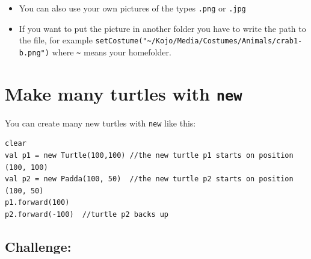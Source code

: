 \begin{itemize}

\item {You can also use your own pictures of the types \lstinline{.png} or \lstinline{.jpg}}
\item {If you want to put the picture in another folder you have to write the path to the file, for example \lstinline{setCostume("~/Kojo/Media/Costumes/Animals/crab1-b.png")} where \lstinline{~} means your homefolder.}

\end{itemize}


\chapter{Make many turtles with \lstinline{new}}You can create many new turtles with \lstinline{new} like this:

\begin{lstlisting}[basicstyle={\ttfamily\fontsize{18}{22}\selectfont},numbers=none]
clear
val p1 = new Turtle(100,100) //the new turtle p1 starts on position (100, 100)
val p2 = new Padda(100, 50)  //the new turtle p2 starts on position (100, 50)
p1.forward(100)
p2.forward(-100)  //turtle p2 backs up
\end{lstlisting}
        

  
\section*{\color{BrickRed}Challenge:}


